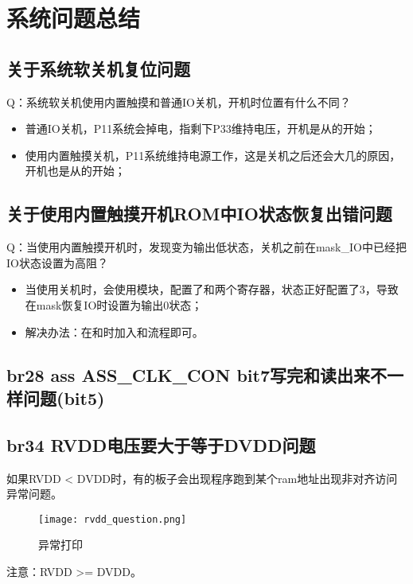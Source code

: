 \section{系统问题总结}
\subsection{关于系统软关机复位问题}
Q：系统软关机使用内置触摸和普通IO关机，开机时位置有什么不同？
\begin{itemize}
    \item 普通IO关机，P11系统会掉电，指剩下P33维持电压，开机是从的开始；
    \item 使用内置触摸关机，P11系统维持电源工作，这是关机之后还会大几的原因，开机也是从的开始；
\end{itemize}

\subsection{关于使用内置触摸开机ROM中IO状态恢复出错问题}
Q：当使用内置触摸开机时，发现变为输出低状态，关机之前在mask\_IO中已经把IO状态设置为高阻？
\begin{itemize}
    \item 当使用关机时，会使用模块，配置了和两个寄存器，状态正好配置了3，导致在mask恢复IO时设置为输出0状态；
    \item 解决办法：在和时加入和流程即可。
\end{itemize}

\subsection{br28 ass ASS\_CLK\_CON bit7写完和读出来不一样问题(bit5)}

\subsection{br34 RVDD电压要大于等于DVDD问题}
如果RVDD < DVDD时，有的板子会出现程序跑到某个ram地址出现非对齐访问异常问题。
\begin{figure}[H]
\centering
\texttt{[image: rvdd\_question.png]}
\caption{异常打印}
\label{fig:rvdd_exeception}
\end{figure}
注意：RVDD >= DVDD。

